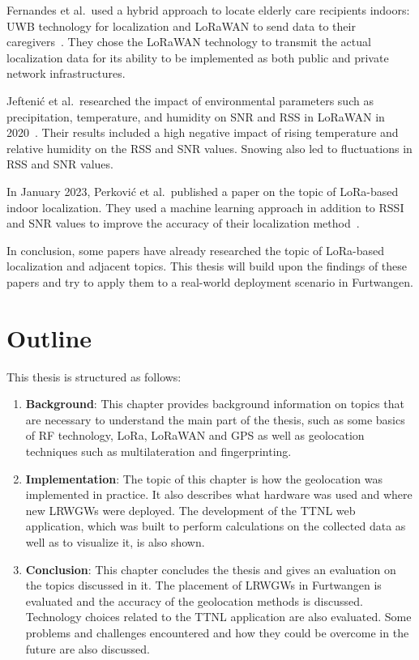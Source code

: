 Fernandes et al.\ used a hybrid approach to locate elderly care recipients indoors: \ac{UWB} technology for localization and \ac{LoRaWAN} to send data to their caregivers~\cite{fernandes_hybrid_2020}.
They chose the \ac{LoRaWAN} technology to transmit the actual localization data for its ability to be implemented as both public and private network infrastructures.

Jeftenić et al.\ researched the impact of environmental parameters such as precipitation, temperature, and humidity on \ac{SNR} and \ac{RSS} in \ac{LoRaWAN} in 2020~\cite{jeftenic_impact_2020}.
Their results included a high negative impact of rising temperature and relative humidity on the \ac{RSS} and \ac{SNR} values.
Snowing also led to fluctuations in \ac{RSS} and \ac{SNR} values.

In January 2023, Perković et al.\ published a paper on the topic of \ac{LoRa}-based indoor localization.
They used a machine learning approach in addition to \ac{RSSI} and \ac{SNR} values to improve the accuracy of their localization method~\cite{perkovic_machine_2023}.

In conclusion, some papers have already researched the topic of \ac{LoRa}-based localization and adjacent topics.
This thesis will build upon the findings of these papers and try to apply them to a real-world deployment scenario in Furtwangen.

\section{Outline}

This thesis is structured as follows:

\begin{enumerate}
      \item \textbf{Background}:
            This chapter provides background information on topics that are necessary to understand the main part of the thesis, such as some basics of \ac{RF} technology, \ac{LoRa}, \ac{LoRaWAN} and \ac{GPS} as well as geolocation techniques such as multilateration and fingerprinting.
      \item \textbf{Implementation}:
            The topic of this chapter is how the geolocation was implemented in practice.
            It also describes what hardware was used and where new \aclp{LRWGW} were deployed.
            The development of the \ac{TTNL} web application, which was built to perform calculations on the collected data as well as to visualize it, is also shown.
      \item \textbf{Conclusion}:
            This chapter concludes the thesis and gives an evaluation on the topics discussed in it.
            The placement of \aclp{LRWGW} in Furtwangen is evaluated and the accuracy of the geolocation methods is discussed.
            Technology choices related to the \ac{TTNL} application are also evaluated.
            Some problems and challenges encountered and how they could be overcome in the future are also discussed.
\end{enumerate}

